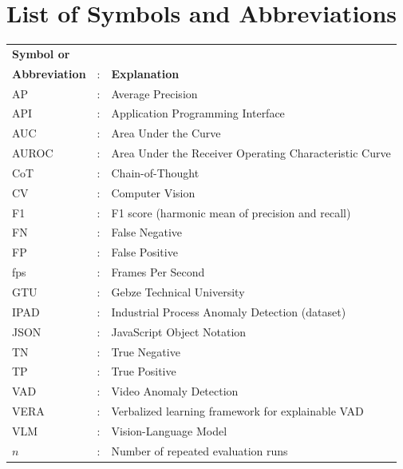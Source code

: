 \chapter*{List of Symbols and Abbreviations}

\begin{tabular}{lcl}
    \textbf{Symbol or}&&\\
    \textbf{Abbreviation} &:& \textbf{Explanation}\\
    
    
    AP    &:& Average Precision\\
    API   &:& Application Programming Interface\\
    AUC   &:& Area Under the Curve\\
    AUROC &:& Area Under the Receiver Operating Characteristic Curve\\
    CoT   &:& Chain-of-Thought\\
    CV    &:& Computer Vision\\
    F1    &:& F1 score (harmonic mean of precision and recall)\\
    FN    &:& False Negative\\
    FP    &:& False Positive\\
    fps   &:& Frames Per Second\\
    GTU   &:& Gebze Technical University\\
    IPAD  &:& Industrial Process Anomaly Detection (dataset)\\
    JSON  &:& JavaScript Object Notation\\
    TN    &:& True Negative\\
    TP    &:& True Positive\\
    VAD   &:& Video Anomaly Detection\\
    VERA  &:& Verbalized learning framework for explainable VAD\\
    VLM   &:& Vision-Language Model\\
    $n$   &:& Number of repeated evaluation runs\\

\end{tabular}

\clearpage
